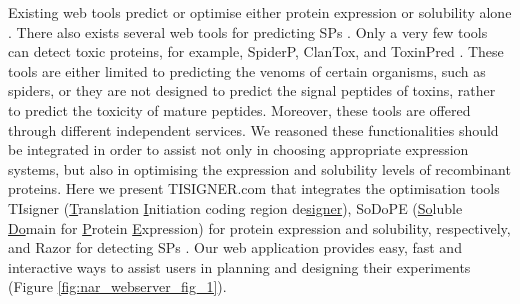 Existing web tools predict or optimise either protein expression or
solubility alone
\cite{Agostini2014-te,Chin2014-wu,Grote2005-vr,Puigbo2007-oj,Hebditch2017-bg,Hon2020-gk,Smialowski2012-yg,Sormanni2015-yr,Zayni2018-wc}.
There also exists several web tools for predicting SPs
\cite{Almagro_Armenteros2019-vr,Bagos2009-wh,Hiller2004-gc,Kall2004-te,Savojardo2017-ux}.
Only a very few tools can detect toxic proteins, for example, SpiderP, ClanTox,
and ToxinPred \cite{Gupta2013-fw,Naamati2009-uf,Wong2013-qh}. 
These tools are either limited to predicting the
venoms of certain organisms, such as spiders, or they are not designed
to predict the signal peptides of toxins, rather to predict the toxicity
of mature peptides.
Moreover, these tools are offered through different independent
services. We reasoned these functionalities should be integrated in
order to assist not only in choosing appropriate expression systems, but
also in optimising the expression and solubility levels of recombinant
proteins. Here we present TISIGNER.com that integrates the optimisation
tools TIsigner (\underline{T}ranslation \underline{I}nitiation coding
region de\underline{signer}), SoDoPE (\underline{So}luble
\underline{Do}main for \underline{P}rotein \underline{E}xpression) for
protein expression and solubility, respectively, and Razor for detecting
SPs \cite{Bhandari2021-wd,Bhandari2020-pz,Bhandari2020-oj}. Our web application provides easy, fast and interactive ways to
assist users in planning and designing their experiments (Figure \ref{fig:nar_webserver_fig_1}).

